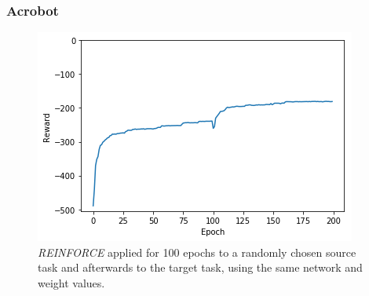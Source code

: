 \subsubsection{Acrobot} %
\label{ssub:reinforce_source_target:acrobot}
\begin{figure}[htb]
    \centering
    \includegraphics[width=.8\linewidth]{images/results/Acrobot/reinforce_2tasks.png}
    \caption{\textit{REINFORCE} applied for 100 epochs to a randomly chosen source task and afterwards to the target task, using the same network and weight values.}
    \label{fig:Acrobot:reward_reinforce_2tasks}
\end{figure}
